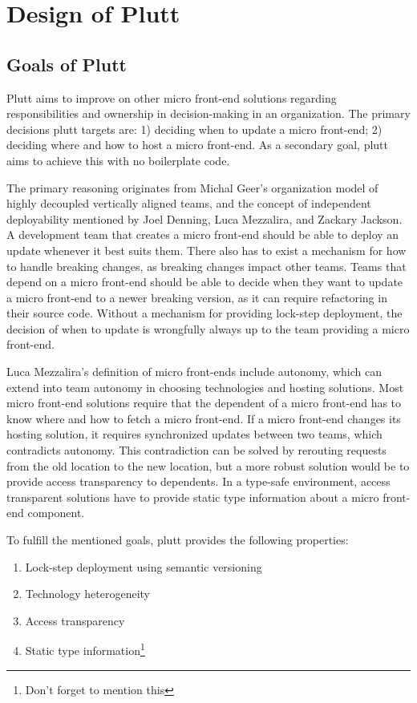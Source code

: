 \chapter{Design of Plutt}

\section{Goals of Plutt}

Plutt aims to improve on other micro front-end solutions regarding responsibilities and ownership in decision-making in an organization. The primary decisions plutt targets are: 1) deciding when to update a micro front-end; 2) deciding where and how to host a micro front-end. As a secondary goal, plutt aims to achieve this with no boilerplate code.

The primary reasoning originates from Michal Geer's organization model of highly decoupled vertically aligned teams, and the concept of independent deployability mentioned by Joel Denning, Luca Mezzalira, and Zackary Jackson. A development team that creates a micro front-end should be able to deploy an update whenever it best suits them. There also has to exist a mechanism for how to handle breaking changes, as breaking changes impact other teams. Teams that depend on a micro front-end should be able to decide when they want to update a micro front-end to a newer breaking version, as it can require refactoring in their source code. Without a mechanism for providing lock-step deployment, the decision of when to update is wrongfully always up to the team providing a micro front-end.

Luca Mezzalira's definition of micro front-ends include autonomy, which can extend into team autonomy in choosing technologies and hosting solutions. Most micro front-end solutions require that the dependent of a micro front-end has to know where and how to fetch a micro front-end. If a micro front-end changes its hosting solution, it requires synchronized updates between two teams, which contradicts autonomy. This contradiction can be solved by rerouting requests from the old location to the new location, but a more robust solution would be to provide access transparency to dependents. In a type-safe environment, access transparent solutions have to provide static type information about a micro front-end component.

To fulfill the mentioned goals, plutt provides the following properties:

\begin{enumerate}
    \item Lock-step deployment using semantic versioning
    \item Technology heterogeneity
    \item Access transparency
    \item Static type information\footnote{Don't forget to mention this}
\end{enumerate}

